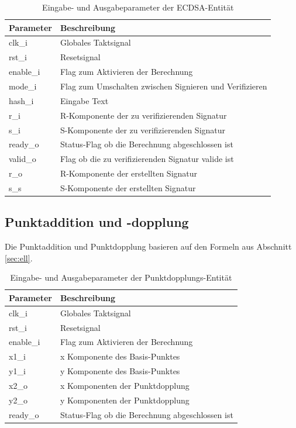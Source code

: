 \begin{table} [h]
	\centering 
	\begin{tabular}{ | p{3cm} | p{12cm} | }
		\hline
		\textbf{Parameter} & \textbf{Beschreibung}\\
		\hline
		clk\_i & Globales Taktsignal \\
		\hline
		rst\_i & Resetsignal \\
		\hline
		enable\_i & Flag zum Aktivieren der Berechnung \\
		\hline
		mode\_i & Flag zum Umschalten zwischen Signieren und Verifizieren \\
		\hline
		hash\_i & Eingabe Text \\
		\hline
		r\_i & R-Komponente der zu verifizierenden Signatur \\
		\hline
		s\_i & S-Komponente der zu verifizierenden Signatur \\
		\hline
		ready\_o & Status-Flag ob die Berechnung abgeschlossen ist  \\
		\hline
		valid\_o & Flag ob die zu verifizierenden Signatur valide ist \\
		\hline
		r\_o & R-Komponente der erstellten Signatur \\
		\hline
		s\_s & S-Komponente der erstellten Signatur \\
		\hline
	\end{tabular}
	\caption{Eingabe- und Ausgabeparameter der ECDSA-Entität}
	\label{tab:vhdl-impl-ecdsa-param}
\end{table}

\subsection{Punktaddition und -dopplung}
Die Punktaddition und Punktdopplung basieren auf den Formeln aus Abschnitt \ref{sec:ell}. \\

\begin{table} [h]
	\centering 
	\begin{tabular}{ | p{3cm} | p{12cm} | }
		\hline
		\textbf{Parameter} & \textbf{Beschreibung}\\
		\hline
		clk\_i & Globales Taktsignal \\
		\hline
		rst\_i & Resetsignal \\
		\hline
		enable\_i & Flag zum Aktivieren der Berechnung \\
		\hline
		x1\_i & x Komponente des Basis-Punktes \\
		\hline
		y1\_i & y Komponente des Basis-Punktes \\
		\hline
		x2\_o & x Komponenten der Punktdopplung \\
		\hline
		y2\_o & y Komponenten der Punktdopplung \\
		\hline
		ready\_o & Status-Flag ob die Berechnung abgeschlossen ist  \\
		\hline
		\hline
	\end{tabular}
	\caption{Eingabe- und Ausgabeparameter der Punktdopplungs-Entität}
	\label{tab:vhdl-impl-eccdouble-param}
\end{table}

